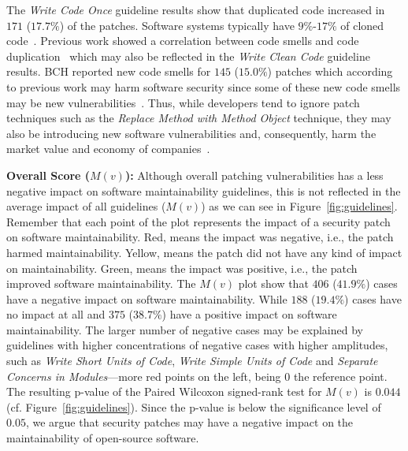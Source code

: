 \documentclass[smallextended]{svjour3}       %
\begin{document}
The \emph{Write Code Once} guideline results show that duplicated 
code increased in $171$ ($17.7\%$) of the patches. Software systems 
typically have $9\%$-$17\%$ of cloned code~\cite{5773403}. Previous 
work showed a correlation between code smells and code
duplication~\cite{7476787} which may also be reflected in the 
\emph{Write Clean Code} guideline results. BCH reported new code 
smells for $145$ ($15.0\%$) patches which according to previous work 
may harm software security since some of these new code smells may 
be new vulnerabilities~\cite{8819456}. Thus, while developers 
tend to ignore patch techniques such as the \emph{Replace Method 
with Method Object} technique, they may also be introducing new 
software vulnerabilities and, consequently, harm the market value 
and economy of companies~\cite{4267025}.

\textbf{Overall Score ($M(v)$):} 
Although overall patching vulnerabilities has a less negative impact
on software maintainability guidelines, this is not reflected in the 
average impact of all guidelines ($M(v)$) as we can see in 
Figure~\ref{fig:guidelines}. Remember that each point of the plot 
represents the impact of a security patch on software 
maintainability. Red, means the impact was negative, i.e., the patch 
harmed maintainability. Yellow, means the patch did not have any 
kind of impact on maintainability. Green, means the impact was 
positive, i.e., the patch improved software maintainability.
The $M(v)$ plot show that $406$ ($41.9\%$) cases have a negative 
impact on software maintainability. While $188$ ($19.4\%$) cases 
have no impact at all and $375$ ($38.7\%$) have a positive impact on 
software maintainability. The larger number of negative cases may be 
explained by guidelines with higher concentrations of negative 
cases with higher amplitudes, such as \emph{Write Short Units of 
Code}, \emph{Write Simple Units of Code} and \emph{Separate Concerns 
in Modules}---more red points on the left, being $0$ the reference point.
The resulting p-value of the Paired Wilcoxon signed-rank test for $M(v)$ 
is $0.044$ (cf. Figure~\ref{fig:guidelines}). Since the p-value is 
below the significance level of $0.05$, we argue that security patches 
may have a negative impact on the maintainability of open-source software.
\end{document}
